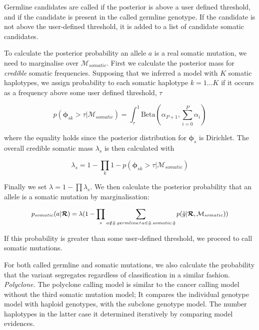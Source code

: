 \documentclass[notitlepage, twocolumn]{article}
\begin{document}
Germline candidates are called if the posterior is above a user defined threshold, and if the candidate is present in the called germline genotype. If the candidate is not above the user-defined threshold, it is added to a list of candidate somatic candidates.

To calculate the posterior probability an allele $a$ is a real somatic mutation, we need to marginalise over $\mathcal{M}_{somatic}$. First we calculate the posterior mass for \emph{credible} somatic frequencies. Supposing that we inferred a model with $K$ somatic haplotypes, we assign probability to each somatic haplotype $k = 1 \dots K$ if it occurs as a frequency above some user defined threshold, $\tau$

\begin{equation*}
p(\boldsymbol{\phi}_{sk} > \tau | \mathcal{M}_{somatic}) = \int_{\tau}^1 \text{Beta}(\alpha_{P + 1}, \sum_{i = 0}^{P} \alpha_i)
\end{equation*}

where the equality holds since the posterior distribution for $\boldsymbol{\phi}_{s}$ is Dirichlet. The overall credible somatic mass $\lambda_{s}$ is then calculated with

\begin{equation*}
\lambda_{s} = 1 - \prod_k 1 - p(\boldsymbol{\phi}_{sk} > \tau | \mathcal{M}_{somatic})
\end{equation*}

Finally we set $\lambda = 1 - \prod \lambda_s$. We then calculate the posterior probability that an allele is a somatic mutation by marginalisation:

\begin{equation*}\small
p_{somatic}(a | \boldsymbol{\mathcal{R}}) = \lambda(1 - \prod_s \sum_{a \notin \tilde{g}.germline \land a \in \tilde{g}.somatic : \tilde{g}}p(\tilde{g} | \boldsymbol{\mathcal{R}}, \mathcal{M}_{somatic}))
\end{equation*}

\noindent If this probability is greater than some user-defined threshold, we proceed to call somatic mutations.

For both called germline and somatic mutations, we also calculate the probability that the variant segregates regardless of classification in a similar fashion. \\

\emph{Polyclone.} The polyclone calling model is similar to the cancer calling model without the third somatic mutation model; It compares the individual genotype model with haploid genotypes, with the subclone genotype model. The number haplotypes in the latter case it determined iteratively by comparing model evidences.
\end{document}
